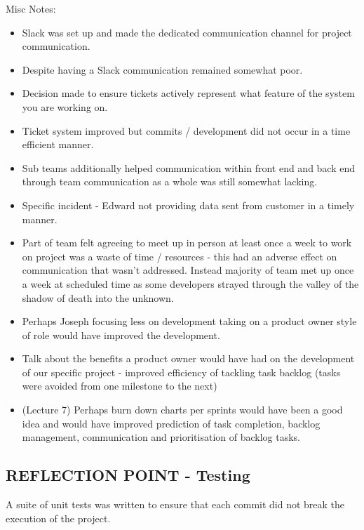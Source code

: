 \documentclass{l3proj}
\begin{document}
Misc Notes:
\begin{itemize}
\item Slack was set up and made the dedicated communication channel for project communication.
\item Despite having a Slack communication remained somewhat poor.
\item Decision made to ensure tickets actively represent what feature of the system you are working on.
\item Ticket system improved but commits / development did not occur in a time efficient manner.
\item Sub teams additionally helped communication within front end and back end through team communication as a whole was still somewhat lacking.
\item Specific incident - Edward not providing data sent from customer in a timely manner.
\item Part of team felt agreeing to meet up in person at least once a week to work on project was a waste of time / resources - this had an adverse effect on communication that wasn’t addressed. Instead majority of team met up once a week at scheduled time as some developers strayed through the valley of the shadow of death into the unknown.
\item Perhaps Joseph focusing less on development taking on a product owner style of role would have improved the development.
\item Talk about the benefits a product owner would have had on the development of our specific project - improved efficiency of tackling task backlog (tasks were avoided from one milestone to the next)
\item (Lecture 7) Perhaps burn down charts per sprints would have been a good idea and would have improved prediction of task completion, backlog management, communication and prioritisation of backlog tasks.
\end{itemize}


\subsection{REFLECTION POINT - Testing}
\label{testing}
A suite of unit tests was written to ensure that each commit did not break the execution of the project.

\end{document}
